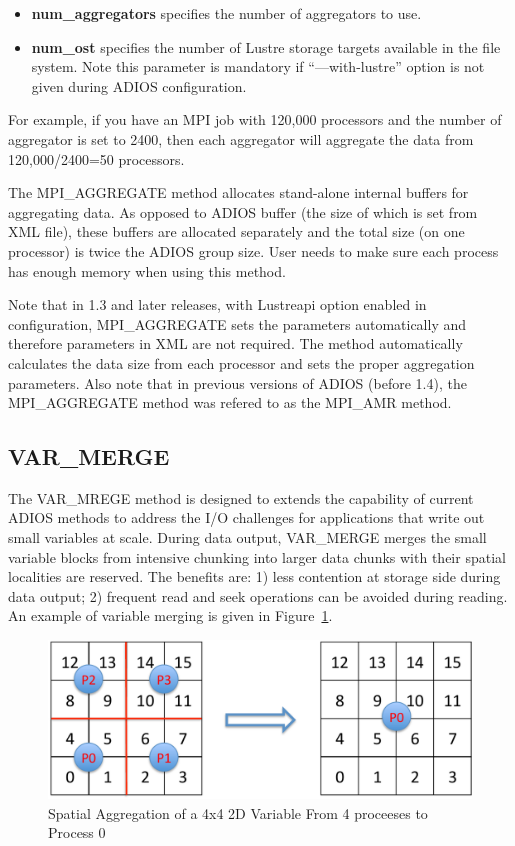 \begin{itemize}
\item \textbf{num\_aggregators} specifies the number of aggregators 
to use.
\item \textbf{num\_ost }specifies the number of Lustre storage targets 
 available in the file system. Note this parameter is mandatory if ``---with-lustre'' 
option is not given during ADIOS configuration.
\end{itemize}

For example, if you have an MPI job with 120,000 processors and the number of aggregator 
is set to 2400, then each aggregator will aggregate the data from 120,000/2400=50 
processors.

The MPI\_AGGREGATE method allocates stand-alone internal buffers for aggregating data. 
As opposed to ADIOS buffer (the size of which is set from XML file), these buffers 
are allocated separately and the total size (on one processor) is twice the ADIOS 
group size. User needs to make sure each process has enough memory when using this 
method.  

Note that in 1.3 and later releases, with Lustreapi option enabled in configuration, 
MPI\_AGGREGATE sets the parameters automatically and therefore parameters in XML are 
not required. The method automatically calculates the data size from each processor 
and sets the proper aggregation parameters. Also note that in previous versions
of ADIOS (before 1.4), the MPI\_AGGREGATE method was refered to as the MPI\_AMR
method. 


\subsection{VAR\_MERGE}
\label{section-method-varmerge}
The VAR\_MREGE method is designed to extends the capability of current ADIOS
methods to address the I/O challenges for applications
that write out small variables at scale. During data output, 
VAR\_MERGE merges the small variable blocks from intensive chunking into
larger data chunks with their spatial localities are reserved. The benefits
are: 1) less contention at storage side during data
output; 2) frequent read and seek operations can be avoided during reading.
An example of variable merging is given in Figure~\ref{fig:sar}. 


\begin{figure}[htbp]
\begin{center}
\includegraphics[width=0.5\columnwidth]{figures/sar.pdf}
\caption{Spatial Aggregation of a 4x4 2D Variable From 4 proceeses to Process 0}
\label{fig:sar}
\end{center}
\end{figure}


